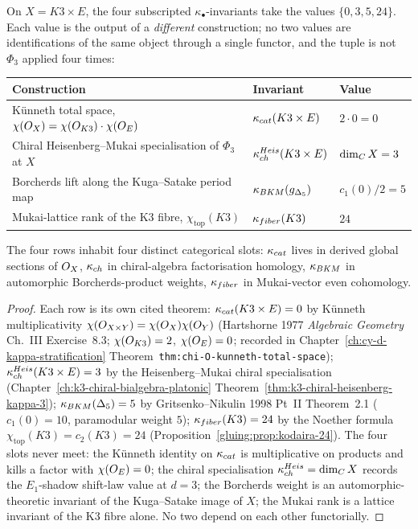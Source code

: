 \begin{theorem}
\label{gluing:thm:four-kappa-spectrum}
On $X = K3 \times E$, the four subscripted $\kappa_\bullet$-invariants take
the values $\{0, 3, 5, 24\}$. Each value is the output of a
\emph{different} construction; no two values are identifications of
the same object through a single functor, and the tuple is not
$\Phi_3$ applied four times:
\begin{center}
\begin{tabular}{|l|l|l|}
\hline
Construction & Invariant & Value \\ \hline
K\"unneth total space, $\chi(O_X) = \chi(O_{K3}) \cdot
\chi(O_E)$ & $\kappa_{cat}(K3 \times E)$ & $2 \cdot 0 = 0$ \\
Chiral Heisenberg--Mukai specialisation of $\Phi_3$ at $X$ &
$\kappa_{ch}^{Heis}(K3 \times E)$ & $\dim_{C} X = 3$ \\
Borcherds lift along the Kuga--Satake period map &
$\kappa_{BKM}(g_{\Delta_5})$ & $c_1(0)/2 = 5$ \\
Mukai-lattice rank of the K3 fibre, $\chi_{\mathrm{top}}(K3)$ &
$\kappa_{fiber}(K3)$ & $24$ \\ \hline
\end{tabular}
\end{center}
The four rows inhabit four distinct categorical slots:
$\kappa_{cat}$ lives in derived global sections of $O_X$, $\kappa_{ch}$ in
chiral-algebra factorisation homology, $\kappa_{BKM}$ in automorphic
Borcherds-product weights, $\kappa_{fiber}$ in Mukai-vector even cohomology.
\end{theorem}

\begin{proof}
Each row is its own cited theorem:
$\kappa_{cat}(K3 \times E) = 0$ by K\"unneth multiplicativity
$\chi(O_{X \times Y}) = \chi(O_X) \chi(O_Y)$
(Hartshorne 1977 \emph{Algebraic Geometry} Ch.~III Exercise~8.3;
$\chi(O_{K3}) = 2$, $\chi(O_E) = 0$; recorded in
Chapter~\ref{ch:cy-d-kappa-stratification}
Theorem~\texttt{thm:chi-O-kunneth-total-space});
$\kappa_{ch}^{Heis}(K3 \times E) = 3$ by the Heisenberg--Mukai
chiral specialisation
(Chapter~\ref{ch:k3-chiral-bialgebra-platonic}
Theorem~\ref{thm:k3-chiral-heisenberg-kappa-3});
$\kappa_{BKM}(\Delta_5) = 5$ by Gritsenko--Nikulin 1998 Pt~II Theorem~2.1
($c_1(0) = 10$, paramodular weight $5$);
$\kappa_{fiber}(K3) = 24$ by the Noether formula $\chi_{\mathrm{top}}(K3) =
c_2(K3) = 24$ (Proposition~\ref{gluing:prop:kodaira-24}).
The four slots never meet: the K\"unneth identity on $\kappa_{cat}$ is
multiplicative on products and kills a factor with $\chi(O_E) =
0$; the chiral specialisation $\kappa_{ch}^{Heis} = \dim_{C} X$
records the $E_1$-shadow shift-law value at $d = 3$; the Borcherds
weight is an automorphic-theoretic invariant of the Kuga--Satake
image of $X$; the Mukai rank is a lattice invariant of the K3
fibre alone. No two depend on each other functorially.
\end{proof}

